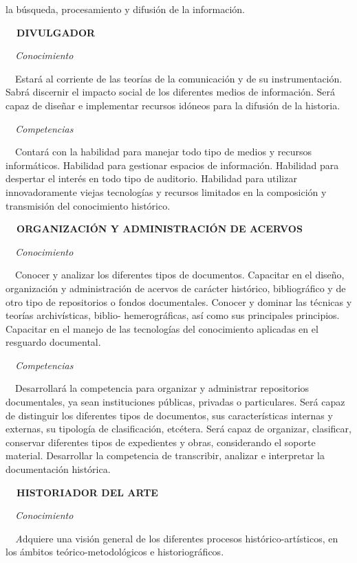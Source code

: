 {la búsqueda, procesamiento y difusión de la información.  \par 
\textbf{\ \ DIVULGADOR} \par \textit{\ \ Conocimiento }\par \ \ Estará 
al corriente de las teorías de la comunicación y de su instrumentación. 
Sabrá discernir el impacto social de los diferentes medios de 
información. Será capaz de diseñar e implementar recursos idóneos para 
la difusión de la historia. \par \textit{\ \ Competencias} \par \ \ 
Contará con la habilidad para manejar todo tipo de medios y recursos 
informáticos. Habilidad para gestionar espacios de información. 
Habilidad para despertar el interés en todo tipo de auditorio. 
Habilidad para utilizar innovadoramente viejas tecnologías y recursos 
limitados en la composición y transmisión del conocimiento histórico.  
\par \textbf{\ \ ORGANIZACIÓN Y ADMINISTRACIÓN DE ACERVOS }\par 
\textit{\ \ Conocimiento} \par \ \ Conocer y analizar los diferentes 
tipos de documentos. Capacitar en el diseño, organización y 
administración de acervos de carácter histórico, bibliográfico y de 
otro tipo de repositorios o fondos documentales. Conocer y dominar las 
técnicas y teorías archivísticas, biblio- hemerográficas, así como sus 
principales principios. Capacitar en el manejo de las tecnologías del 
conocimiento aplicadas en el resguardo documental.  \par \textit{\ \ 
Competencias }\par \ \ Desarrollará la competencia para organizar y 
administrar repositorios documentales, ya sean instituciones públicas, 
privadas o particulares. Será capaz de distinguir los diferentes tipos 
de documentos, sus características internas y externas, su tipología de 
clasificación, etcétera. Será capaz de organizar, clasificar, conservar 
diferentes tipos de expedientes y obras, considerando el soporte 
material.  Desarrollar la competencia de transcribir, analizar e 
interpretar la documentación histórica.  \par \textbf{\ \ HISTORIADOR 
DEL ARTE} \par \textit{\ \ Conocimiento }\par \textit{\ \ A}dquiere una 
visión general de los diferentes procesos histórico-artísticos, en los 
ámbitos teórico-metodológicos e historiográficos. \par \textit{\ \ 
}}
